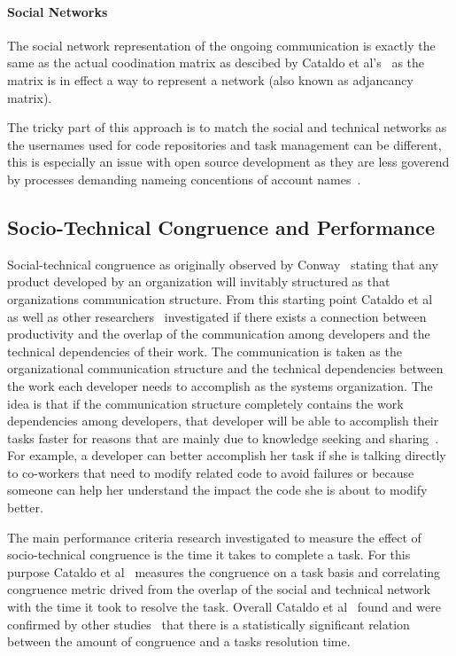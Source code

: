 \paragraph{Social Networks}
The social network representation of the ongoing communication is exactly the same as the actual coodination matrix as descibed by Cataldo et al's~\cite{cataldo:cscw:2006} as the matrix is in effect a way to represent a network (also known as adjancancy matrix).

The tricky part of this approach is to match the social and technical networks as the usernames used for code repositories and task management can be different, this is especially an issue with open source development as they are less goverend by processes demanding nameing concentions of account names~\cite{}.

\subsection{Socio-Technical Congruence and Performance}
Social-technical congruence as originally observed by Conway~\cite{conway:datamination:1968} stating that any product developed by an organization will invitably structured as that organizations communication structure.
From this starting point Cataldo et al~\cite{cataldo:cscw:2006} as well as other researchers~\cite{valetto:msr:2007,ducheneaut:cscw:2005,ehrlich:stc:2008} investigated if there exists a connection between productivity and the overlap of the communication among developers and the technical dependencies of their work.
The communication is taken as the organizational communication structure and the technical dependencies between the work each developer needs to accomplish as the systems organization.
The idea is that if the communication structure completely contains the work dependencies among developers, that developer will be able to accomplish their tasks faster for reasons that are mainly due to knowledge seeking and sharing~\cite{desouza2006:knowledge}.
For example, a developer can better accomplish her task if she is talking directly to co-workers that need to modify related code to avoid failures or because someone can help her understand the impact the code she is about to modify better.

The main performance criteria research investigated to measure the effect of socio-technical congruence is the time it takes to complete a task.
For this purpose Cataldo et al~\cite{cataldo:cscw:2006} measures the congruence on a task basis and correlating congruence metric drived from the overlap of the social and technical network with the time it took to resolve the task.
Overall Cataldo et al~\cite{cataldo:cscw:2006} found and were confirmed by other studies~\cite{valetto:msr:2007,ehrlich:stc:2008} that there is a statistically significant relation between the amount of congruence and a tasks resolution time.

